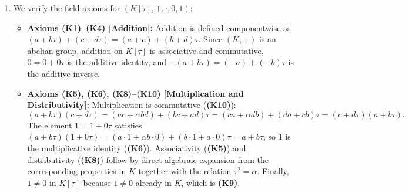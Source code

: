 \begin{exercisesolution}
\label{sol:quadratic_field_extensions}
\begin{enumerate}[label=\textbf{(\alph*)}]
    \item We verify the field axioms for $(K[\tau], +, \cdot, 0, 1)$:
    \begin{itemize}
        \item \textbf{Axioms \textbf{(K1)}--\textbf{(K4)} [Addition]:} Addition is defined componentwise as $(a+b\tau) + (c+d\tau) = (a+c) + (b+d)\tau$. Since $(K, +)$ is an abelian group, addition on $K[\tau]$ is associative and commutative, $0 = 0 + 0\tau$ is the additive identity, and $-(a+b\tau) = (-a) + (-b)\tau$ is the additive inverse.
        
        \item \textbf{Axioms \textbf{(K5)}, \textbf{(K6)}, \textbf{(K8)}--\textbf{(K10)} [Multiplication and Distributivity]:}
        Multiplication is commutative (\textbf{(K10)}):
        \[
        (a+b\tau)(c+d\tau) = (ac + \alpha bd) + (bc + ad)\tau = (ca + \alpha db) + (da + cb)\tau = (c+d\tau)(a+b\tau).
        \]
        The element $1 = 1 + 0\tau$ satisfies $(a+b\tau)(1+0\tau) = (a\cdot 1 + \alpha b\cdot 0) + (b\cdot 1 + a\cdot 0)\tau = a+b\tau$, so $1$ is the multiplicative identity (\textbf{(K6)}). Associativity (\textbf{(K5)}) and distributivity (\textbf{(K8)}) follow by direct algebraic expansion from the corresponding properties in $K$ together with the relation $\tau^2 = \alpha$. Finally, $1 \ne 0$ in $K[\tau]$ because $1 \ne 0$ already in $K$, which is \textbf{(K9)}.
        

\end{itemize}
\end{enumerate}
\end{exercisesolution}
